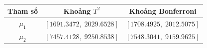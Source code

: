 \begin{center}\begin{tabular}{ccc}\toprule
Tham số & Khoảng $T^2$ & Khoảng Bonferroni\\\midrule
$\mu_1$ & $[1691.3472,\;2029.6528]$ & $[1708.4925,\;2012.5075]$\\
$\mu_2$ & $[7457.4128,\;9250.8538]$ & $[7548.3041,\;9159.9625]$\\
\bottomrule\end{tabular}\end{center}
